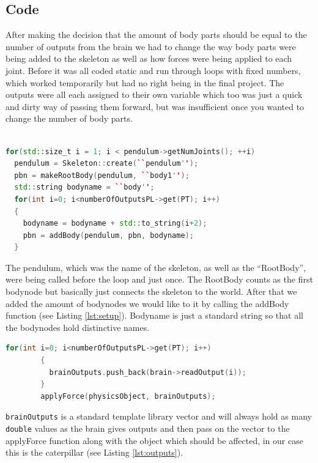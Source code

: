 \documentclass[12pt,oneside,listof=totoc,paper=a4,headings=small]{scrbook}
\begin{document}
\subsection{Code}

After making the decision that the amount of body parts should be equal to the number of outputs from the brain we had to change the way body parts were being added to the skeleton as well as how forces were being applied to each joint. Before it was all coded static and run through loops with fixed numbers, which worked temporarily but had no right being in the final project. The outputs were all each assigned to their own variable which too was just a quick and dirty way of passing them forward, but was insufficient once you wanted to change the number of body parts. 
\begin{lstlisting}[language=C++, label={lst:setup}, caption=Dynamic Caterpillar setup]

for(std::size_t i = 1; i < pendulum->getNumJoints(); ++i)
  pendulum = Skeleton::create(``pendulum'');
  pbn = makeRootBody(pendulum, ``body1'');
  std::string bodyname = ``body'';
  for(int i=0; i<numberOfOutputsPL->get(PT); i++)
  {
    bodyname = bodyname + std::to_string(i+2);
    pbn = addBody(pendulum, pbn, bodyname);
  }
\end{lstlisting}

The pendulum, which was the name of the skeleton, as well as the ``RootBody'', were being called before the loop and just once. The RootBody counts as the first bodynode but basically just connects the skeleton to the world. After that we added the amount of bodynodes we would like to it by calling the addBody function (see Listing \ref{lst:setup}). Bodyname is just a standard string so that all the bodynodes hold distinctive names.

\newpage

\begin{lstlisting}[language=C++, label={lst:outputs}, caption=Dynamic Brain Outputs]
 for(int i=0; i<numberOfOutputsPL->get(PT); i++)
        {
          brainOutputs.push_back(brain->readOutput(i));
        }
        applyForce(physicsObject, brainOutputs);
\end{lstlisting}

\lstinline{brainOutputs} is a standard template library vector and will always hold as many \lstinline{double} values as the brain gives outputs and then pass on the vector to the applyForce function along with the object which should be affected, in our case this is the caterpillar (see Listing \ref{lst:outputs}).
\end{document}
